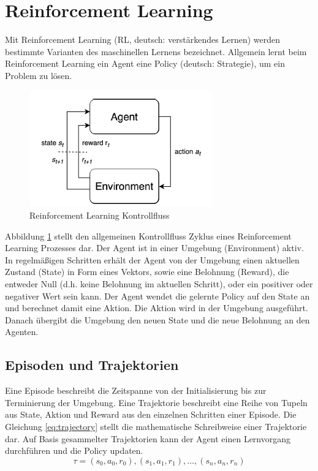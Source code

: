\section{Reinforcement Learning}
Mit Reinforcement Learning (RL, deutsch: verstärkendes Lernen) werden bestimmte Varianten des maschinellen Lernens bezeichnet. Allgemein lernt beim Reinforcement Learning ein Agent eine Policy (deutsch: Strategie), um ein Problem zu lösen.\\
\begin{figure}
    \centering
    \includegraphics{resources/img/Reinforcement_Learning/RL Control Loop.png}
    \caption{Reinforcement Learning Kontrollfluss \cite{FoundationsDeepRL}}
    \label{fig:rl_control_loop}
\end{figure}
Abbildung \ref{fig:rl_control_loop} stellt den allgemeinen Kontrollfluss Zyklus eines Reinforcement Learning Prozesses dar. Der Agent ist in einer Umgebung (Environment) aktiv. In regelmäßigen Schritten erhält der Agent von der Umgebung einen aktuellen Zustand (State) in Form eines Vektors, sowie eine Belohnung (Reward), die entweder Null (d.h. keine Belohnung im aktuellen Schritt), oder ein positiver oder negativer Wert sein kann. Der Agent wendet die gelernte Policy auf den State an und berechnet damit eine Aktion. Die Aktion wird in der Umgebung ausgeführt. Danach übergibt die Umgebung den neuen State und die neue Belohnung an den Agenten.\\

\subsection{Episoden und Trajektorien}
Eine Episode beschreibt die Zeitspanne von der Initialisierung bis zur Terminierung der Umgebung. Eine Trajektorie beschreibt eine Reihe von Tupeln aus State, Aktion und Reward aus den einzelnen Schritten einer Episode. Die Gleichung \ref{eq:trajectory} stellt die mathematische Schreibweise einer Trajektorie dar. Auf Basis gesammelter Trajektorien kann der Agent einen Lernvorgang durchführen und die Policy updaten.
\begin{equation}
    \tau = (s_0,a_0,r_0), (s_1,a_1,r_1), \dots, (s_n,a_n,r_n)
    \label{eq:trajectory}
\end{equation}

